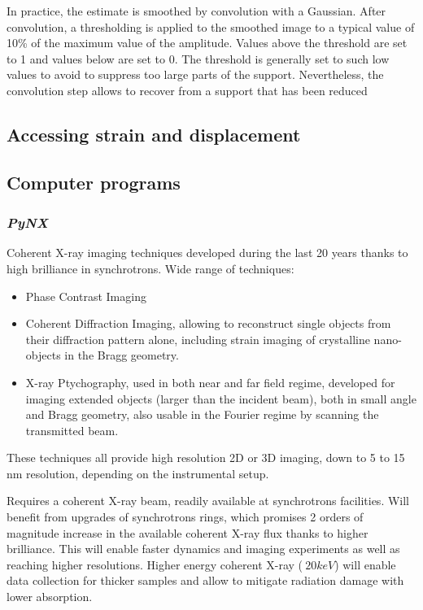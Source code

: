 In practice, the estimate is smoothed by convolution with a Gaussian. After convolution, a thresholding is applied to the smoothed image to a typical value of 10\% of the maximum value of the amplitude. Values above the threshold are set to 1 and values below are set to 0. The threshold is generally set to such low values to avoid to suppress too large parts of the support. Nevertheless, the convolution step allows to recover from a support that has been reduced

\subsection{Accessing strain and displacement}


\lipsum


\subsection{Computer programs}

\subsubsection{\textit{PyNX}}
Coherent X-ray imaging techniques developed during the last 20 years thanks to high brilliance in synchrotrons. Wide range of techniques:

\begin{itemize}
    \item Phase Contrast Imaging
    \item Coherent Diffraction Imaging, allowing to reconstruct single objects from their diffraction pattern alone, including strain imaging of crystalline nano-objects in the Bragg geometry.
    \item X-ray Ptychography, used in both near and far field regime, developed for imaging extended objects (larger than the incident beam), both in small angle and Bragg geometry, also usable in the Fourier regime by scanning the transmitted beam.
\end{itemize}
These techniques all provide high resolution 2D or 3D imaging, down to 5 to 15 nm resolution, depending on the instrumental setup.

Requires a coherent X-ray beam, readily available at synchrotrons facilities. Will benefit from upgrades of synchrotrons rings, which promises 2 orders of magnitude increase in the available coherent X-ray flux thanks to higher brilliance. This will enable faster dynamics and imaging experiments as well as reaching higher resolutions.
Higher energy coherent X-ray ($\>20 keV$) will enable data collection for thicker samples and allow to mitigate radiation damage with lower absorption.

